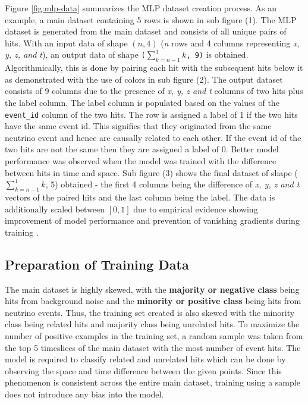 Figure \ref{fig:mlp-data} summarizes the MLP dataset creation process.
As an example, a main dataset containing 5 rows is shown in sub figure
(1). The MLP dataset is generated from the main dataset and consists
of all unique pairs of hits. With an input data of shape $(n, 4)$
(\emph{n} rows and 4 columns representing \emph{x, y, z, and t}), an
output data of shape \texttt{($\sum_{k=n-1}^{1}k$, 9)} is obtained.
Algorithmically, this is done by pairing each hit with the subsequent
hits below it as demonstrated with the use of colors in sub figure
(2). The output dataset consists of 9 columns due to the presence of
\emph{x, y, z and t} columns of two hits plus the label column. The
label column is populated based on the values of the
\texttt{event\_id} column of the two hits. The row is assigned a label
of 1 if the two hits have the same event id. This signifies that they
originated from the same neutrino event and hence are causally related
to each other. If the event id of the two hits are not the same then
they are assigned a label of 0. Better model performance was observed
when the model was trained with the difference between hits in time
and space. Sub figure (3) shows the final dataset of shape
($\sum_{k=n-1}^{1}k$, 5) obtained - the first 4 columns being the
difference of \emph{x, y, z and t} vectors of the paired hits and the
last column being the label. The data is additionally scaled between
$[0,1]$ due to empirical evidence showing improvement of model
performance and prevention of vanishing gradients during training
\cite{bengio2012practical, goodfellow2016deep}.

\subsection{Preparation of Training Data}
\label{sec:mlp-data-prep-train}

The main dataset is highly skewed, with the \textbf{majority or
  negative class} being hits from background noise and the
\textbf{minority or positive class} being hits from neutrino events.
Thus, the training set created is also skewed with the minority class
being related hits and majority class being unrelated hits. To
maximize the number of positive examples in the training set, a random
sample was taken from the top 5 timeslices of the main dataset with
the most number of event hits. The model is required to classify
related and unrelated hits which can be done by observing the space
and time difference between the given points. Since this phenomenon is
consistent across the entire main dataset, training using a sample
does not introduce any bias into the model.

